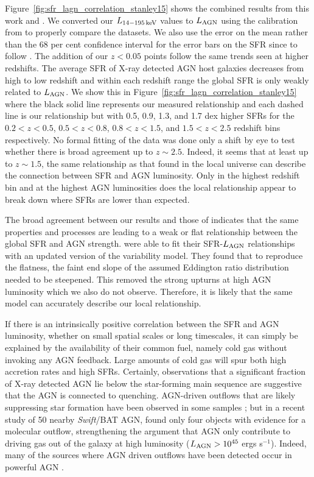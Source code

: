 \documentclass[fleqn, usenatbib]{mnras}
\newcommand{\swift}{\textit{Swift}}
\begin{document}
Figure~\ref{fig:sfr_lagn_correlation_stanley15} shows the combined results from this work and \citet{Stanley:2015qy}. We converted our $L_{\rm 14-195\,keV}$ values to $L_{\rm AGN}$ using the calibration from \citet{Winter:2012yq} to properly compare the datasets. We also use the error on the mean rather than the 68 per cent confidence interval for the error bars on the SFR since to follow \citet{Stanley:2015qy}. The addition of our $z<0.05$ points follow the same trends seen at higher redshifts. The average SFR of X-ray detected AGN host galaxies decreases from high to low redshift and within each redshift range the global SFR is only weakly related to $L_{\rm AGN}$. We show this in Figure~\ref{fig:sfr_lagn_correlation_stanley15} where the black solid line represents our measured relationship and each dashed line is our relationship but with 0.5, 0.9, 1.3, and 1.7 dex higher SFRs for the $0.2<z<0.5$, $0.5<z<0.8$, $0.8<z<1.5$, and $1.5<z<2.5$ redshift bins respectively. No formal fitting of the data was done only a shift by eye to test whether there is broad agreement up to $z\sim2.5$. Indeed, it seems that at least up to $z\sim1.5$, the same relationship as that found in the local universe can describe the connection between SFR and AGN luminosity. Only in the highest redshift bin and at the highest AGN luminosities does the local relationship appear to break down where SFRs are lower than expected.

The broad agreement between our results and those of \citet{Stanley:2015qy} indicates that the same properties and processes are leading to a weak or flat relationship between the global SFR and AGN strength. \citet{Stanley:2015qy} were able to fit their SFR-$L_{\rm AGN}$ relationships with an updated version of the \citet{Hickox:2014yq} variability model. They found that to reproduce the flatness, the faint end slope of the assumed Eddington ratio distribution needed to be steepened. This removed the strong upturns at high AGN luminosity which we also do not observe. Therefore, it is likely that the same model can accurately describe our local relationship.
 
If there is an intrinsically positive correlation between the SFR and AGN luminosity, whether on small spatial scales or long timescales, it can simply be explained by the availability of their common fuel, namely cold gas without invoking any AGN feedback. Large amounts of cold gas will spur both high accretion rates and high SFRs. Certainly, observations that a significant fraction of X-ray detected AGN lie below the star-forming main sequence \citep{Shimizu:2015xo, Matsuoka:2015fk, Mullaney:2015wn} are suggestive that the AGN is connected to quenching. AGN-driven outflows that are likely suppressing star formation have been observed in some samples \citep{Veilleux:2013qq, Cicone:2014ty, Genzel:2014rm, Tombesi:2015fj}; but in a recent study of 50 nearby \swift/BAT AGN, \citet{Stone:2016zl} found only four objects with evidence for a molecular outflow, strengthening the argument that AGN only contribute to driving gas out of the galaxy at high luminosity ($L_{\rm AGN} > 10^{45}$ ergs s$^{-1}$). Indeed, many of the sources where AGN driven outflows have been detected occur in powerful AGN \citep[e.g.][]{Cano-Diaz:2012en,Brusa:2015qk,Cresci:2015tk,Perna:2015rd}. 
\end{document}
